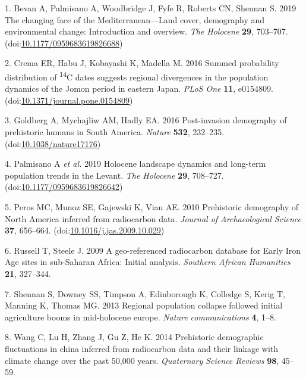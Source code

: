 \documentclass[
]{sa}
\newenvironment{cslreferences}%
  {}%
  {\par}
\begin{document}
\hypertarget{refs}{}
\begin{cslreferences}
\leavevmode\hypertarget{ref-Bevan2019}{}%
1. Bevan A, Palmisano A, Woodbridge J, Fyfe R, Roberts CN, Shennan S. 2019 The changing face of the Mediterranean---Land cover, demography and environmental change: Introduction and overview. \emph{The Holocene} \textbf{29}, 703--707. (doi:\href{https://doi.org/10.1177/0959683619826688}{10.1177/0959683619826688})

\leavevmode\hypertarget{ref-Crema2016}{}%
2. Crema ER, Habu J, Kobayashi K, Madella M. 2016 Summed probability distribution of \textsuperscript{14}C dates suggests regional divergences in the population dynamics of the Jomon period in eastern Japan. \emph{PLoS One} \textbf{11}, e0154809. (doi:\href{https://doi.org/10.1371/journal.pone.0154809}{10.1371/journal.pone.0154809})

\leavevmode\hypertarget{ref-Goldberg2016}{}%
3. Goldberg A, Mychajliw AM, Hadly EA. 2016 Post-invasion demography of prehistoric humans in South America. \emph{Nature} \textbf{532}, 232--235. (doi:\href{https://doi.org/10.1038/nature17176}{10.1038/nature17176})

\leavevmode\hypertarget{ref-Palmisano2019}{}%
4. Palmisano A \emph{et al.} 2019 Holocene landscape dynamics and long-term population trends in the Levant. \emph{The Holocene} \textbf{29}, 708--727. (doi:\href{https://doi.org/10.1177/0959683619826642}{10.1177/0959683619826642})

\leavevmode\hypertarget{ref-Peros2010}{}%
5. Peros MC, Munoz SE, Gajewski K, Viau AE. 2010 Prehistoric demography of North America inferred from radiocarbon data. \emph{Journal of Archaeological Science} \textbf{37}, 656--664. (doi:\href{https://doi.org/10.1016/j.jas.2009.10.029}{10.1016/j.jas.2009.10.029})

\leavevmode\hypertarget{ref-Russell2009}{}%
6. Russell T, Steele J. 2009 A geo-referenced radiocarbon database for Early Iron Age sites in sub-Saharan Africa: Initial analysis. \emph{Southern African Humanities} \textbf{21}, 327--344.

\leavevmode\hypertarget{ref-Shennan2013}{}%
7. Shennan S, Downey SS, Timpson A, Edinborough K, Colledge S, Kerig T, Manning K, Thomas MG. 2013 Regional population collapse followed initial agriculture booms in mid-holocene europe. \emph{Nature communications} \textbf{4}, 1--8.

\leavevmode\hypertarget{ref-Wang2014}{}%
8. Wang C, Lu H, Zhang J, Gu Z, He K. 2014 Prehistoric demographic fluctuations in china inferred from radiocarbon data and their linkage with climate change over the past 50,000 years. \emph{Quaternary Science Reviews} \textbf{98}, 45--59.


\end{cslreferences}
\end{document}
